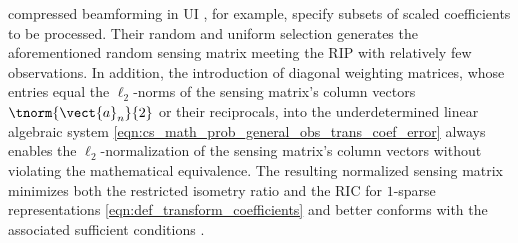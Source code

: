 compressed beamforming in
\ac{UI}
\cite{article:ChernyakovaITUFFC2018,proc:SchiffnerIUS2016a,article:BurshteinITUFFC2016,article:ChernyakovaITUFFC2014,article:WagnerITSP2012}, for example, specify
subsets of
scaled  coefficients to
be processed.
Their random and uniform selection generates
the aforementioned random sensing matrix meeting
the \ac{RIP} with
relatively few observations.
In addition,
the introduction of
diagonal weighting matrices, whose
entries equal
the $\ell_{2}$-norms of
the sensing matrix's column vectors
$\tnorm{ \vect{a}_{n} }{2}$ or
their reciprocals, into
the underdetermined linear algebraic system
\eqref{eqn:cs_math_prob_general_obs_trans_coef_error} always enables
the $\ell_{2}$-normalization of
the sensing matrix's column vectors without violating
the mathematical equivalence.
The resulting normalized sensing matrix minimizes both
the restricted isometry ratio and
the \ac{RIC} for
$1$-sparse representations
\eqref{eqn:def_transform_coefficients} and better conforms with
the associated sufficient conditions
\cite[Prop. 6.2]{book:Foucart2013}.

